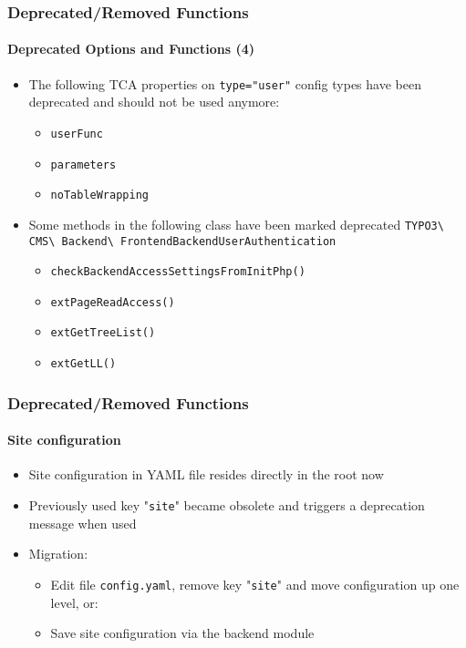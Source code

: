 \begin{frame}[fragile]
	\frametitle{Deprecated/Removed Functions}
	\framesubtitle{Deprecated Options and Functions (4)}

	\begin{itemize}
		\item The following TCA properties on \texttt{type="user"} config types
			have been deprecated and should not be used anymore:

			\begin{itemize}
				\item \texttt{userFunc}
				\item \texttt{parameters}
				\item \texttt{noTableWrapping}
			\end{itemize}

		\item Some methods in the following class have been marked deprecated
			\small
				\texttt{TYPO3\textbackslash
					CMS\textbackslash
					Backend\textbackslash
					FrontendBackendUserAuthentication}
			\normalsize

			\begin{itemize}
				\item \texttt{checkBackendAccessSettingsFromInitPhp()}
				\item \texttt{extPageReadAccess()}
				\item \texttt{extGetTreeList()}
				\item \texttt{extGetLL()}
			\end{itemize}

	\end{itemize}

\end{frame}


\begin{frame}[fragile]
	\frametitle{Deprecated/Removed Functions}
	\framesubtitle{Site configuration}

	\begin{itemize}
		\item Site configuration in YAML file resides directly in the root now
		\item Previously used key "\texttt{site}" became obsolete and triggers
			a deprecation message when used
		\item Migration:

			\begin{itemize}
				\item Edit file \texttt{config.yaml}, remove key "\texttt{site}"
					and move configuration up one level, or:
				\item Save site configuration via the backend module
			\end{itemize}
	\end{itemize}

\end{frame}

